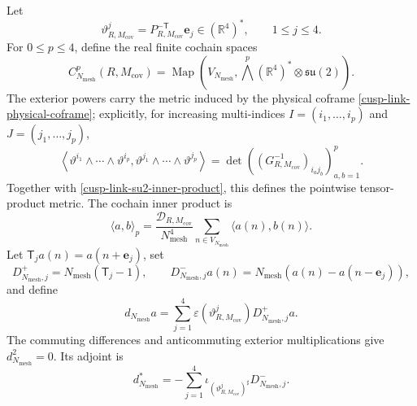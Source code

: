 Let
\begin{equation}
 \vartheta^j_{R,M_{\mathrm{cov}}}
 =P_{R,M_{\mathrm{cov}}}^{-\mathsf T}\mathbf e_j
 \in(\mathbb R^4)^*,
 \qquad 1\leq j\leq4.
 \label{cusp-link-physical-coframe}
\end{equation}
For \(0\leq p\leq4\), define the real finite cochain spaces
\begin{equation}
 C^p_{N_{\mathrm{mesh}}}(R,M_{\mathrm{cov}})
 =\operatorname{Map}\left(
 V_{N_{\mathrm{mesh}}},
 \bigwedge^p(\mathbb R^4)^*\otimes\mathfrak{su}(2)
 \right).
 \label{cusp-link-cochain-spaces}
\end{equation}
The exterior powers carry the metric induced by the physical coframe
\eqref{cusp-link-physical-coframe}; explicitly, for increasing multi-indices
\(I=(i_1,\ldots,i_p)\) and \(J=(j_1,\ldots,j_p)\),
\begin{equation}
 \left\langle
  \vartheta^{i_1}\wedge\cdots\wedge\vartheta^{i_p},
  \vartheta^{j_1}\wedge\cdots\wedge\vartheta^{j_p}
 \right\rangle
 =
 \det\left((G_{R,M_{\mathrm{cov}}}^{-1})_{i_a j_b}\right)_{a,b=1}^p.
 \label{cusp-link-exterior-metric}
\end{equation}
Together with \eqref{cusp-link-su2-inner-product}, this defines the
pointwise tensor-product metric.  The cochain inner product is
\begin{equation}
 \langle a,b\rangle_p
 =\frac{\mathcal D_{R,M_{\mathrm{cov}}}}{N_{\mathrm{mesh}}^4}
   \sum_{n\in V_{N_{\mathrm{mesh}}}}
   \langle a(n),b(n)\rangle.
 \label{cusp-link-cochain-inner-product}
\end{equation}
Let \(\mathsf T_j a(n)=a(n+\mathbf e_j)\), set
\begin{equation}
 D^+_{N_{\mathrm{mesh}},j}
 =N_{\mathrm{mesh}}(\mathsf T_j-1),
 \qquad
 D^-_{N_{\mathrm{mesh}},j}a(n)
 =N_{\mathrm{mesh}}(a(n)-a(n-\mathbf e_j)),
 \label{cusp-link-differences}
\end{equation}
and define
\begin{equation}
 d_{N_{\mathrm{mesh}}}a
 =\sum_{j=1}^4
  \varepsilon(\vartheta^j_{R,M_{\mathrm{cov}}})
  D^+_{N_{\mathrm{mesh}},j}a.
 \label{cusp-link-finite-exterior-derivative}
\end{equation}
The commuting differences and anticommuting exterior multiplications give
\(d_{N_{\mathrm{mesh}}}^2=0\).  Its adjoint is
\begin{equation}
 d_{N_{\mathrm{mesh}}}^*
 =-\sum_{j=1}^4
  \iota_{(\vartheta^j_{R,M_{\mathrm{cov}}})^\sharp}
  D^-_{N_{\mathrm{mesh}},j}.
 \label{cusp-link-finite-adjoint}
\end{equation}
